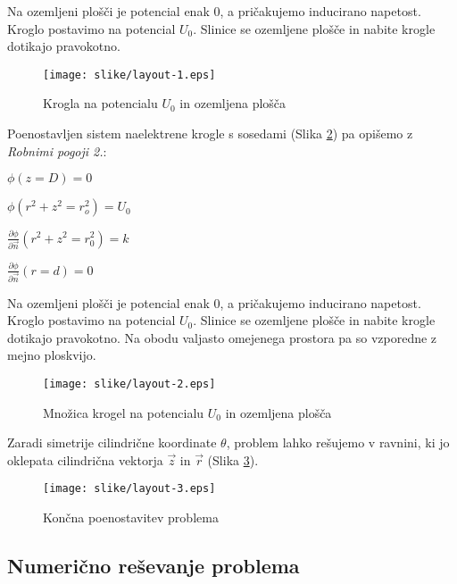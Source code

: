 \documentclass{article}[12pt]
\begin{document}
Na ozemljeni plošči je potencial enak 0, a pričakujemo inducirano napetost. Kroglo postavimo na potencial $U_0$.
Slinice se ozemljene plošče in nabite krogle dotikajo pravokotno.

\begin{figure}[h]
\begin{center}
\texttt{[image: slike/layout-1.eps]}
\caption{Krogla na potencialu $U_0$ in ozemljena plošča}
\label{layout-1}
\end{center}
\end{figure}

Poenostavljen sistem naelektrene krogle s sosedami (Slika \ref{layout-2}) pa opišemo z \textit{Robnimi pogoji 2.}:\newline

$ \phi (z = D) = 0 $

$ \phi (r^2 + z^2 = r_o^2) = U_0 $

$ \frac{\partial \phi}{\partial \vec{n}} ( r^2 + z^2 = r_0^2) = k $

$ \frac{\partial \phi}{\partial \vec{n}} (r = d) = 0 $
\newline

Na ozemljeni plošči je potencial enak 0, a pričakujemo inducirano napetost. Kroglo postavimo na potencial $U_0$.
Slinice se ozemljene plošče in nabite krogle dotikajo pravokotno. Na obodu valjasto omejenega prostora pa so vzporedne z mejno ploskvijo.

\newpage

\begin{figure}[h]
\begin{center}
\texttt{[image: slike/layout-2.eps]}
\caption{Množica krogel na potencialu $U_0$ in ozemljena plošča}
\label{layout-2}
\end{center}
\end{figure}

Zaradi simetrije cilindrične koordinate $\theta$, problem lahko rešujemo v ravnini, ki jo oklepata cilindrična vektorja $\vec{z}$ in $\vec{r}$ (Slika \ref{layout-3}).

\begin{figure}[h]
\begin{center}
\texttt{[image: slike/layout-3.eps]}
\caption{Končna poenostavitev problema}
\label{layout-3}
\end{center}
\end{figure}

\subsection{Numerično reševanje problema}
\end{document}
